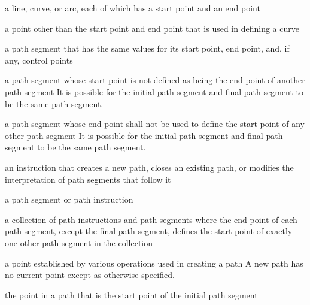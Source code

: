 
a line, \bezierlocal curve, or arc, each of which has a start point and an end point

a point other than the start point and end point that is used in defining a \bezierlocal curve

a path segment that has the same values for its start point, end point, and, if any, control points

a path segment whose start point is not defined as being the end point of another path segment
\enternote
It is possible for the initial path segment and final path segment to be the same path segment.
\exitnote

a path segment whose end point shall not be used to define the start point of any other path segment
\enternote
It is possible for the initial path segment and final path segment to be the same path segment.
\exitnote

an instruction that creates a new path, closes an existing path, or modifies the interpretation of path segments that follow it

a path segment or path instruction

a collection of path instructions and path segments where the end point of each path segment, except the final path segment, defines the start point of exactly one other path segment in the collection

a point established by various operations used in creating a path
\enternote
A new path has no current point except as otherwise specified.
\exitnote

the point in a path that is the start point of the initial path segment

